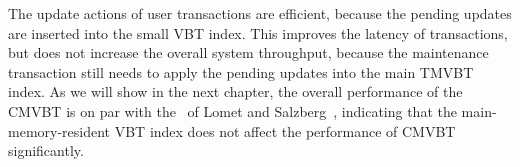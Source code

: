 The update actions of user transactions are efficient, because the pending
updates are inserted into the small VBT index.
This improves the latency of transactions, but does not increase the overall
system throughput, because the maintenance transaction still needs to apply
the pending updates into the main TMVBT index.
As we will show in the next chapter, the overall performance of the
CMVBT is on par with the \TSBtree\ of Lomet and
Salzberg~\cite{lomet:1989:tsb,lomet:1990:tsb-performance,lomet:2005:immortaldb,lomet:2006:transactiontime,lomet:2008:version-compression,lomet:2009:improving},
indicating that the main-memory-resident VBT index does not affect the
performance of CMVBT significantly.

